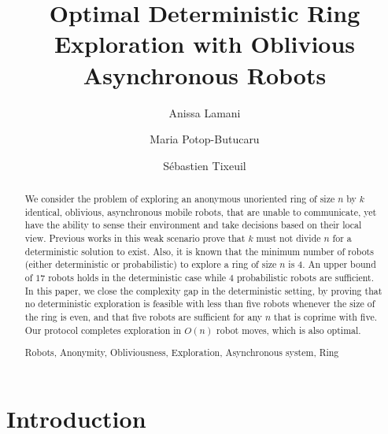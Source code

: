 \documentclass[12pt]{llncs}
\newcommand{\keywords}[1]{\par\addvspace\baselineskip
\noindent\keywordname\enspace\ignorespaces#1}
\begin{document}
\title{Optimal Deterministic Ring Exploration with Oblivious Asynchronous Robots}
\author{Anissa Lamani \and Maria Potop-Butucaru \and
S\'{e}bastien Tixeuil
}
\maketitle
\begin {abstract}
We consider the problem of exploring an anonymous unoriented ring of size $n$ by $k$ identical, oblivious, asynchronous mobile robots, that are unable to communicate, yet have the ability to sense their environment and take decisions based on their local view. Previous works in this weak scenario prove that $k$ must not divide $n$ for a deterministic solution to exist. Also, it is known that the minimum number of robots (either deterministic or probabilistic) to explore a ring of size $n$ is $4$. An upper bound of $17$ robots holds in the deterministic case while $4$ probabilistic robots are sufficient.
In this paper, we close the complexity gap in the deterministic setting, by proving that no deterministic exploration is feasible with less than five robots whenever the size of the ring is even, and that five robots are sufficient for any $n$ that is coprime with five. Our protocol completes exploration in $O(n)$ robot moves, which is also optimal.

\keywords {Robots, Anonymity, Obliviousness, Exploration, Asynchronous system, Ring} 
\end {abstract}
\section{Introduction}\label{sec:Introduction}
\end{document}
